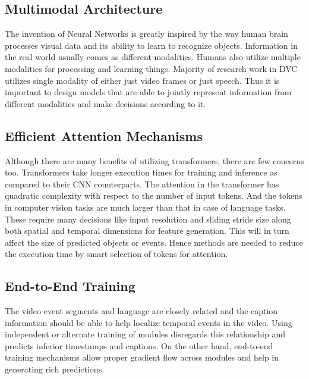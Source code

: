 \subsection{Multimodal Architecture}
\par The invention of Neural Networks is greatly inspired by the way human brain processes visual data and its ability to learn to recognize objects. Information in the real world usually comes as different modalities. Humans also utilize multiple modalities for processing and learning things. Majority of research work in DVC utilizes single modality of either just video frames or just speech. Thus it is important to design models that are able to jointly represent information from different modalities and make decisions according to it.

\subsection{Efficient Attention Mechanisms}
\par Although there are many benefits of utilizing transformers, there are few concerns too. Transformers take longer execution times for training and inference as compared to their CNN counterparts. The attention in the transformer has quadratic complexity with respect to the number of input tokens. And the tokens in computer vision tasks are much larger than that in case of language tasks. These require many decisions like input resolution and sliding stride size along both spatial and temporal dimensions for feature generation. This will in turn affect the size of predicted objects or events. Hence methods are needed to reduce the execution time by smart selection of tokens for attention.

\subsection{End-to-End Training}
\par The video event segments and language are closely related and the caption information should be able to help localize temporal events in the video. Using independent or alternate training of modules disregards this relationship and predicts inferior timestamps and captions. On the other hand, end-to-end training mechanisms allow proper gradient flow across modules and help in generating rich predictions.
